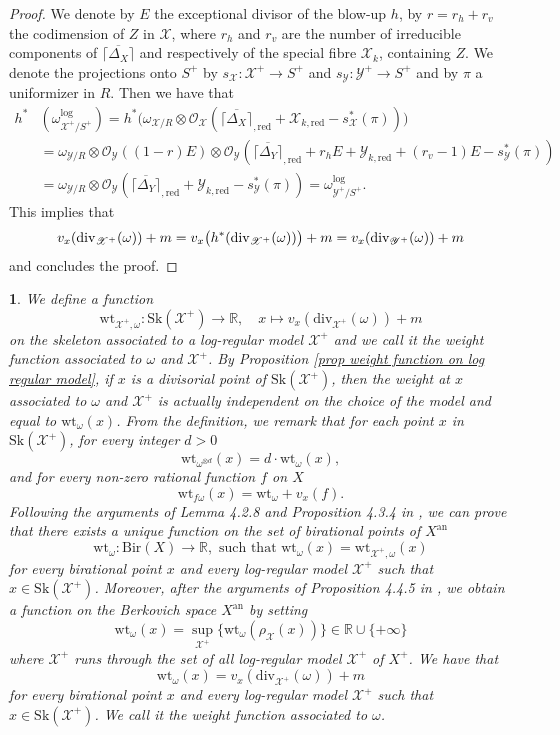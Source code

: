 \documentclass{amsart}%
\numberwithin{equation}{subsection}
\theoremstyle{plain2}
\theoremstyle{definition2}
\theoremstyle{stepstyle}
\theoremstyle{point}
\theoremstyle{subpoint}
\newtheorem{subpoint}[equation]{}%
\newcommand{\spa}[1]{\begin{subpoint}#1\end{subpoint}}           %
\newcommand{\R}{\ensuremath{\mathbb{R}}}
\newcommand{\cX}{\ensuremath{\mathscr{X}}}
\newcommand{\caO}{\ensuremath{\mathcal{O}}}
\newcommand{\cY}{\ensuremath{\mathscr{Y}}}
\renewcommand{\R}{\ensuremath{\mathbb{R}}}
\renewcommand{\cY}{\ensuremath{\mathscr{Y}}}
\newcommand{\redu}{\mathrm{red}}
\newcommand{\an}{\mathrm{an}}
\newcommand{\divisor}{\mathrm{div}}
\newcommand{\weight}{\mathrm{wt}}
\newcommand{\Sk}{\mathrm{Sk}}
\begin{document}
{\begin{proof}
We denote by $E$ the exceptional divisor of the blow-up $h$, by $r=r_h +r_v$ the codimension of $Z$ in $\cX$, where $r_h$ and $r_v$ are the number of irreducible components of $\overline{\lceil\Delta_X \rceil}$ and respectively of the special fibre $\cX_k$, containing $Z$. We denote the projections onto $S^+$ by $s_{\cX}:\cX^+\rightarrow S^+$ and $s_{\cY}:\cY^+ \rightarrow S^+$ and by $\pi$ a uniformizer in $R$. Then we have that
\begin{align*}
h^*&(\omega^{\log}_{\cX^+/S^+}) = h^* \big(\omega_{\cX/R} \otimes \caO_{\cX}(\overline{\lceil\Delta_X \rceil}_{,\redu} + \cX_{k,\redu} - s_\cX^*(\pi)) \big) \\
& = \omega_{\cY/R}\otimes \caO_{\cY}((1-r)E) \otimes \caO_{\cY}(\overline{\lceil\Delta_Y \rceil}_{,\redu} + r_hE+ \cY_{k,\redu} + (r_v-1)E - s_\cY^*(\pi))\\
& = \omega_{\cY/R} \otimes \caO_{\cY}(\overline{\lceil\Delta_Y \rceil}_{,\redu} + \cY_{k,\redu} - s_\cY^*(\pi)) = \omega^{\log}_{\cY^+/S^+}.
\end{align*} This implies that
$$v_x(\divisor_{\cX^+}(\omega)) +m = v_x\big(h^*(\divisor_{\cX^+}(\omega))\big) + m \\= v_x(\divisor_{\cY^+}(\omega)) +m$$ and concludes the proof.
\end{proof}
}

\spa{\label{paragraph weight function}We define a function $$\weight_{\cX^+,\omega}: \Sk(\cX^+) \rightarrow \R, \quad x \mapsto v_x(\divisor_{\cX^+}(\omega)) +m$$ on the skeleton associated to a log-regular model $\cX^+$ and we call it the weight function associated to $\omega$ and $\cX^+$. By Proposition \ref{prop weight function on log regular model}, if $x$ is a divisorial point of $\Sk(\cX^+)$, then the weight at $x$ associated to $\omega$ and $\cX^+$ is actually independent on the choice of the model and equal to $\weight_{\omega}(x)$. From the definition, we remark that for each point $x$ in $\Sk(\cX^+)$, for every integer $d>0$ $$ \weight_{\omega^{\otimes d} }(x)= d \cdot \weight_{\omega}(x),$$ and for every non-zero rational function $f$ on $X$ $$ \weight_{f\omega}(x)= \weight_{\omega} + v_x(f).$$
Following the arguments of Lemma 4.2.8 and Proposition 4.3.4 in \cite{MustataNicaise}, we can prove that there exists a unique function on the set of birational points of $X^\an$ $$\weight_{\omega}: \text{Bir}(X) \rightarrow \R, \text{ such that }\weight_{\omega}(x)= \weight_{\cX^+,\omega}(x)$$ for every birational point $x$ and every log-regular model $\cX^+$ such that $x \in \Sk(\cX^+)$. Moreover, after the arguments of Proposition 4.4.5 in \cite{MustataNicaise}, we obtain a function on the Berkovich space $X^\an$ by setting $$\weight_{\omega}(x) = \sup_{\cX^+} \{ \weight_{\omega}(\rho_\cX (x))\} \in \R \cup \{+ \infty\}$$ where $\cX^+$ runs through the set of all log-regular model $\cX^+$ of $X^+$. We have that \begin{equation} \label{equ:weight function formula} \weight_{\omega}(x)=v_x(\divisor_{\cX^+}(\omega)) +m
\end{equation}for every birational point $x$ and every log-regular model $\cX^+$ such that $x \in \Sk(\cX^+)$. We call it the weight function associated to $\omega$.}
\end{document}
